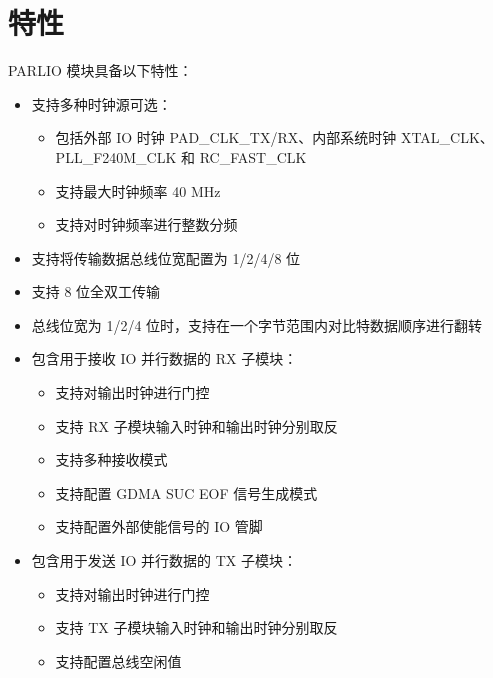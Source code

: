 \documentclass[main\_\_CN.tex]{subfiles}
\begin{document}

\section{特性}
\label{sec:parlio-features}

PARLIO 模块具备以下特性：

\begin{itemize}
    \item 支持多种时钟源可选：
    \begin{itemize}
        \item 包括外部 IO 时钟 PAD\_CLK\_TX/RX、内部系统时钟 XTAL\_CLK、PLL\_F240M\_CLK 和 RC\_FAST\_CLK
        \item 支持最大时钟频率 40 MHz
        \item 支持对时钟频率进行整数分频
    \end{itemize}
    \item 支持将传输数据总线位宽配置为 1/2/4/8 位
    \item 支持 8 位全双工传输
    \item 总线位宽为 1/2/4 位时，支持在一个字节范围内对比特数据顺序进行翻转
    \item 包含用于接收 IO 并行数据的 RX 子模块：
    \begin{itemize}
        \item 支持对输出时钟进行门控
        \item 支持 RX 子模块输入时钟和输出时钟分别取反
        \item 支持多种接收模式
        \item 支持配置 GDMA SUC EOF 信号生成模式
        \item 支持配置外部使能信号的 IO 管脚
    \end{itemize}
    \item 包含用于发送 IO 并行数据的 TX 子模块：
    \begin{itemize}
        \item 支持对输出时钟进行门控
        \item 支持 TX 子模块输入时钟和输出时钟分别取反
        \item 支持配置总线空闲值
    \end{itemize}

\end{itemize}
\end{document}
